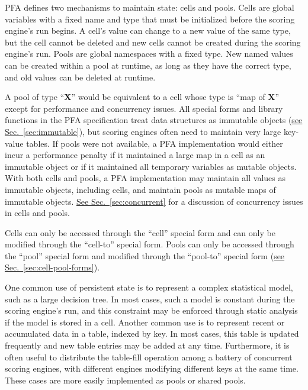 \documentclass{article}
\newcommand{\PFAtp}{\ttfamily\bfseries}
\theoremstyle{definition}
\begin{document}
PFA defines two mechanisms to maintain state: cells and pools.  Cells are global variables with a fixed name and type that must be initialized before the scoring engine's run begins.  A cell's value can change to a new value of the same type, but the cell cannot be deleted and new cells cannot be created during the scoring engine's run.  Pools are global namespaces with a fixed type.  New named values can be created within a pool at runtime, as long as they have the correct type, and old values can be deleted at runtime.

A pool of type ``{\PFAtp X}'' would be equivalent to a cell whose type is ``map of {\PFAtp X}'' except for performance and concurrency issues.  All special forms and library functions in the PFA specification treat data structures as immutable objects (\hyperlink{hsec:immutable}{see Sec.~\ref{sec:immutable}}), but scoring engines often need to maintain very large key-value tables.  If pools were not available, a PFA implementation would either incur a performance penalty if it maintained a large map in a cell as an immutable object or if it maintained all temporary variables as mutable objects.  With both cells and pools, a PFA implementation may maintain all values as immutable objects, including cells, and maintain pools as mutable maps of immutable objects.  \hyperlink{hsec:concurrent}{See Sec.~\ref{sec:concurrent}} for a discussion of concurrency issues in cells and pools.

Cells can only be accessed through the ``cell'' special form and can only be modified through the ``cell-to'' special form.  Pools can only be accessed through the ``pool'' special form and modified through the ``pool-to'' special form (\hyperlink{hsec:cell-pool-forms}{see Sec.~\ref{sec:cell-pool-forms}}).

One common use of persistent state is to represent a complex statistical model, such as a large decision tree.  In most cases, such a model is constant during the scoring engine's run, and this constraint may be enforced through static analysis if the model is stored in a cell.  Another common use is to represent recent or accumulated data in a table, indexed by key.  In most cases, this table is updated frequently and new table entries may be added at any time.  Furthermore, it is often useful to distribute the table-fill operation among a battery of concurrent scoring engines, with different engines modifying different keys at the same time.  These cases are more easily implemented as pools or shared pools.
\end{document}
